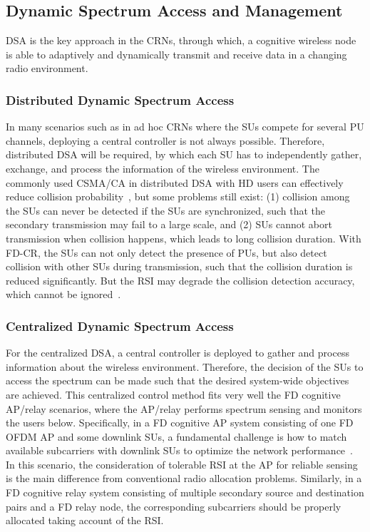 \documentclass[onecolumn,12pt]{IEEEtran}
\begin{document}
\subsection{Dynamic Spectrum Access and Management}

DSA is the key approach in the CRNs, through which, a cognitive wireless node is able to adaptively and dynamically transmit and receive data in a changing radio environment.

\subsubsection{Distributed Dynamic Spectrum Access}

In many scenarios such as in ad hoc CRNs where the SUs compete for several PU channels, deploying a central controller is not always possible. Therefore, distributed DSA will be required, by which each SU has to independently gather, exchange, and process the information of the wireless environment. The commonly used CSMA/CA in distributed DSA with HD users can effectively reduce collision probability~\cite{Xin2008}, but some problems still exist: (1) collision among the SUs can never be detected if the SUs are synchronized, such that the secondary transmission may fail to a large scale, and (2) SUs cannot abort transmission when collision happens, which leads to long collision duration. With FD-CR, the SUs can not only detect the presence of PUs, but also detect collision with other SUs during transmission, such that the collision duration is reduced significantly. But the RSI may degrade the collision detection accuracy, which cannot be ignored~\cite{liao2015icc}.

\subsubsection{Centralized Dynamic Spectrum Access}

For the centralized DSA, a central controller is deployed to gather and process information about the wireless environment. Therefore, the decision of the SUs to access the spectrum can be made such that the desired system-wide objectives are achieved. This centralized control method fits very well the FD cognitive AP/relay scenarios, where the AP/relay performs spectrum sensing and monitors the users below. Specifically, in a FD cognitive AP system consisting of one FD OFDM AP and some downlink SUs, a fundamental challenge is how to match available subcarriers with downlink SUs to optimize the network performance~\cite{Wang2015icc}. In this scenario, the consideration of tolerable RSI at the AP for reliable sensing is the main difference from conventional radio allocation problems. Similarly, in a FD cognitive relay system consisting of multiple secondary source and destination pairs and a FD relay node, the corresponding subcarriers should be properly allocated taking account of the RSI.
\end{document}
